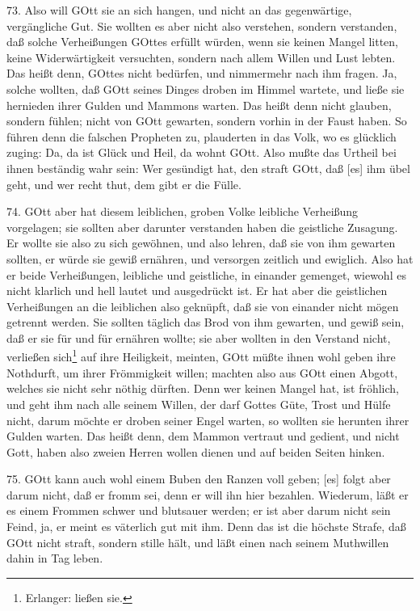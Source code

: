 73. Also will GOtt sie an sich hangen, und nicht an das gegenwärtige, vergängliche Gut. Sie wollten es aber nicht also verstehen, sondern verstanden, daß solche Verheißungen GOttes erfüllt würden, wenn sie keinen Mangel litten, keine Widerwärtigkeit versuchten, sondern nach allem Willen und Lust lebten. Das heißt denn, GOttes nicht bedürfen, und nimmermehr nach ihm fragen. Ja, solche wollten, daß GOtt seines Dinges droben im Himmel wartete, und ließe sie hernieden ihrer Gulden und Mammons warten. Das heißt denn nicht glauben, sondern fühlen; nicht von GOtt gewarten, sondern vorhin in der Faust haben. So führen denn die falschen Propheten zu, plauderten in das Volk, wo es glücklich zuging: Da, da ist Glück und Heil, da wohnt GOtt. Also mußte das Urtheil bei ihnen beständig wahr sein: Wer gesündigt hat, den straft GOtt, daß [es] ihm übel geht, und wer recht thut, dem gibt er die Fülle.

74. GOtt aber hat diesem leiblichen, groben Volke leibliche Verheißung vorgelagen; sie sollten aber darunter verstanden haben die geistliche Zusagung. Er wollte sie also zu sich gewöhnen, und also lehren, daß sie von ihm gewarten sollten, er würde sie gewiß ernähren, und versorgen zeitlich und ewiglich. Also hat er beide Verheißungen, leibliche und geistliche, in einander gemenget, wiewohl es nicht klarlich und hell lautet und ausgedrückt ist. Er hat aber die geistlichen Verheißungen an die leiblichen also geknüpft, daß sie von einander nicht mögen getrennt werden. Sie sollten täglich das Brod von ihm gewarten, und gewiß sein, daß er sie für und für ernähren wollte; sie aber wollten in den Verstand nicht, verließen sich\footnote{Erlanger: ließen sie.} auf ihre Heiligkeit, meinten, GOtt müßte ihnen wohl geben ihre Nothdurft, um ihrer Frömmigkeit willen; machten also aus GOtt einen Abgott, welches sie nicht sehr nöthig dürften. Denn wer keinen Mangel hat, ist fröhlich, und geht ihm nach alle seinem Willen, der darf Gottes Güte, Trost und Hülfe nicht, darum möchte er droben seiner Engel warten, so wollten sie herunten ihrer Gulden warten. Das heißt denn, dem Mammon vertraut und gedient, und nicht Gott, haben
also zweien Herren wollen dienen und auf beiden Seiten hinken.

75. GOtt kann auch wohl einem Buben den Ranzen voll geben; [es] folgt aber darum nicht, daß er fromm sei, denn er will ihn hier bezahlen. Wiederum, läßt er es einem Frommen schwer und blutsauer werden; er ist aber darum nicht sein Feind, ja, er meint es väterlich gut mit ihm. Denn das ist die höchste Strafe, daß GOtt nicht straft, sondern stille hält, und läßt einen nach seinem Muthwillen dahin in Tag leben.

